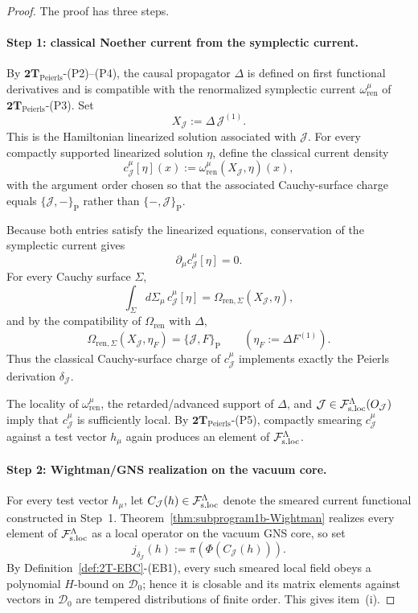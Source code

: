 \begin{proof}
The proof has three steps.

\paragraph{Step 1: classical Noether current from the symplectic current.}
By \(\mathbf{2T}_{\mathrm{Peierls}}\)\textnormal{-(P2)--(P4)}, the causal propagator
\(\Delta\) is defined on first functional derivatives and is compatible with the
renormalized symplectic current \(\omega^\mu_{\mathrm{ren}}\) of
\(\mathbf{2T}_{\mathrm{Peierls}}\)\textnormal{-(P3)}.
Set
\[
X_{\mathcal J}:=\Delta\,\mathcal J^{(1)}.
\]
This is the Hamiltonian linearized solution associated with \(\mathcal J\).
For every compactly supported linearized solution \(\eta\), define the classical current
density
\[
c^\mu_{\mathcal J}[\eta](x)
:=
\omega^\mu_{\mathrm{ren}}(X_{\mathcal J},\eta)(x),
\]
with the argument order chosen so that the associated Cauchy-surface charge equals
\(\{\mathcal J,-\}_{\mathrm P}\) rather than \(\{-,\mathcal J\}_{\mathrm P}\).

Because both entries satisfy the linearized equations, conservation of the symplectic
current gives
\[
\partial_\mu c^\mu_{\mathcal J}[\eta]=0.
\]
For every Cauchy surface \(\Sigma\),
\[
\int_\Sigma d\Sigma_\mu\,c^\mu_{\mathcal J}[\eta]
=
\Omega_{\mathrm{ren},\Sigma}(X_{\mathcal J},\eta),
\]
and by the compatibility of \(\Omega_{\mathrm{ren}}\) with \(\Delta\),
\[
\Omega_{\mathrm{ren},\Sigma}(X_{\mathcal J},\eta_F)
=
\{\mathcal J,F\}_{\mathrm P}
\qquad
(\eta_F:=\Delta F^{(1)}).
\]
Thus the classical Cauchy-surface charge of \(c^\mu_{\mathcal J}\) implements exactly
the Peierls derivation \(\delta_{\mathcal J}\).

The locality of \(\omega^\mu_{\mathrm{ren}}\), the retarded/advanced support of \(\Delta\),
and \(\mathcal J\in\mathcal F_{\mathrm{s.loc}}^\Lambda(O_{\mathcal J})\) imply that \(c^\mu_{\mathcal J}\) is
sufficiently local. By \(\mathbf{2T}_{\mathrm{Peierls}}\)\textnormal{-(P5)}, compactly
smearing \(c^\mu_{\mathcal J}\) against a test vector \(h_\mu\) again produces an element
of \(\mathcal F_{\mathrm{s.loc}}^\Lambda\).

\paragraph{Step 2: Wightman/GNS realization on the vacuum core.}
For every test vector \(h_\mu\), let \(C_{\mathcal J}(h)\in\mathcal F_{\mathrm{s.loc}}^\Lambda\) denote the smeared
current functional constructed in Step~1. Theorem~\ref{thm:subprogram1b-Wightman}
realizes every element of \(\mathcal F_{\mathrm{s.loc}}^\Lambda\) as a local operator on the vacuum GNS core, so set
\[
j_{\delta_{\mathcal J}}(h):=\pi(\Phi(C_{\mathcal J}(h))).
\]
By Definition~\ref{def:2T-EBC}\textnormal{-(EB1)}, every such smeared local field obeys a
polynomial \(H\)-bound on \(\mathcal D_0\); hence it is closable and its matrix elements
against vectors in \(\mathcal D_0\) are tempered distributions of finite order.
This gives item~\textnormal{(i)}.


\end{proof}
